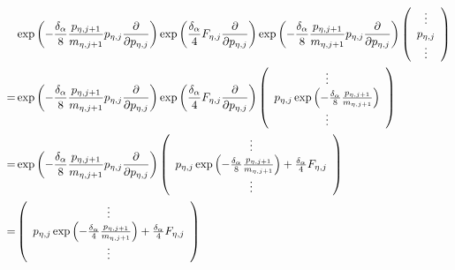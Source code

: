 \documentclass[11pt,a4paper]{article}
\begin{document}
	\[
	\begin{aligned}
    &\exp \left( { - \frac{{{\delta _\alpha }}}{8}\frac{{{p_{\eta ,j + 1}}}}{{{m_{\eta ,j + 1}}}}{p_{\eta ,j}}\frac{\partial }{{\partial {p_{\eta ,j}}}}} \right)\exp \left( {\frac{{{\delta _\alpha }}}{4}{F_{\eta ,j}}\frac{\partial }{{\partial {p_{\eta ,j}}}}} \right)\exp \left( { - \frac{{{\delta _\alpha }}}{8}\frac{{{p_{\eta ,j + 1}}}}{{{m_{\eta ,j + 1}}}}{p_{\eta ,j}}\frac{\partial }{{\partial {p_{\eta ,j}}}}} \right)\left( {\begin{array}{*{20}{c}}
    	\vdots  \\ 
    	{{p_{\eta ,j}}} \\ 
    	\vdots  
    	\end{array}} \right) \hfill \\
    =& \exp \left( { - \frac{{{\delta _\alpha }}}{8}\frac{{{p_{\eta ,j + 1}}}}{{{m_{\eta ,j + 1}}}}{p_{\eta ,j}}\frac{\partial }{{\partial {p_{\eta ,j}}}}} \right)\exp \left( {\frac{{{\delta _\alpha }}}{4}{F_{\eta ,j}}\frac{\partial }{{\partial {p_{\eta ,j}}}}} \right)\left( {\begin{array}{*{20}{c}}
    	\vdots  \\ 
    	{{p_{\eta ,j}}\exp \left( { - \frac{{{\delta _\alpha }}}{8}\frac{{{p_{\eta ,j + 1}}}}{{{m_{\eta ,j + 1}}}}} \right)} \\ 
    	\vdots  
    	\end{array}} \right) \hfill \\
    =& \exp \left( { - \frac{{{\delta _\alpha }}}{8}\frac{{{p_{\eta ,j + 1}}}}{{{m_{\eta ,j + 1}}}}{p_{\eta ,j}}\frac{\partial }{{\partial {p_{\eta ,j}}}}} \right)\left( {\begin{array}{*{20}{c}}
    	\vdots  \\ 
    	{{p_{\eta ,j}}\exp \left( { - \frac{{{\delta _\alpha }}}{8}\frac{{{p_{\eta ,j + 1}}}}{{{m_{\eta ,j + 1}}}}} \right) + \frac{{{\delta _\alpha }}}{4}{F_{\eta ,j}}} \\ 
    	\vdots  
    	\end{array}} \right) \hfill \\
    =& \left( {\begin{array}{*{20}{c}}
    	\vdots  \\ 
    	{{p_{\eta ,j}}\exp \left( { - \frac{{{\delta _\alpha }}}{4}\frac{{{p_{\eta ,j + 1}}}}{{{m_{\eta ,j + 1}}}}} \right) + \frac{{{\delta _\alpha }}}{4}{F_{\eta ,j}}} \\ 
    	\vdots  
    	\end{array}} \right) \hfill \\  
	\end{aligned}
	\]
	
\end{document}
